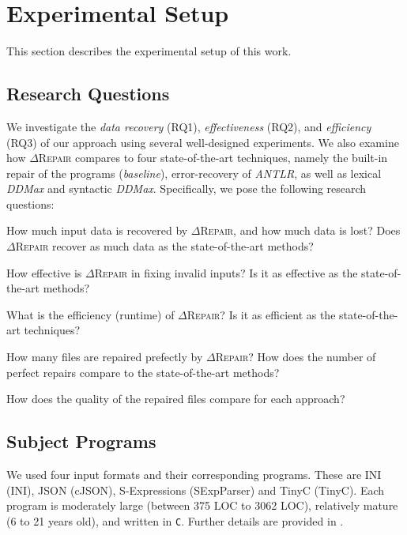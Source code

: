 \documentclass[acmsmall,screen,review,anonymous]{acmart}
\newcommand{\approach}{\textsc{$\Delta$Repair}\xspace}
\newcommand{\ddmax}{\textit{DDMax}\xspace}
\def\<#1>{\texttt{#1}}
\begin{document}
\section{Experimental Setup}
\label{sec:experimental-setup}



This section describes the experimental setup of this work.






\subsection{Research Questions} 
We investigate the \textit{data recovery} (RQ1), \textit{effectiveness} (RQ2), 
and \textit{efficiency} (RQ3) of our approach using several well-designed experiments. %
We also examine how \approach compares to four state-of-the-art techniques, 
namely the built-in repair of the programs (\textit{baseline}), error-recovery of \textit{ANTLR}, as well as 
lexical \ddmax and syntactic 
\ddmax. Specifically, we pose the following research questions:

\begin{description}[labelwidth=!, labelindent=15pt]

\item[RQ1: Data Recovery and Data Loss.]
How much input data is recovered by \approach, and how much data is lost? %
Does \approach recover as much data as 
the state-of-the-art methods?

  \item[RQ2: Effectiveness.]  %
How effective is \approach in fixing invalid inputs? Is it as effective as the state-of-the-art methods?

\item[RQ3: Efficiency.] What is the efficiency (runtime) of
\approach? Is it as efficient as the state-of-the-art techniques?

\item[RQ4: Perfect Repair.] How many files are repaired prefectly by
\approach? How does the number of perfect repairs compare to the state-of-the-art methods?

\item[RQ5: Quality of Repairs.] How does the quality of the repaired files compare for each approach?
\end{description}


\subsection{Subject Programs} %
We used four input formats and their corresponding programs. These are INI (INI), JSON (cJSON), S-Expressions (SExpParser) and TinyC (TinyC). Each program is moderately large (between 375 LOC to 3062 LOC), relatively mature (6 to 21 years old), and written in \<C>. Further details are provided in .
\end{document}
